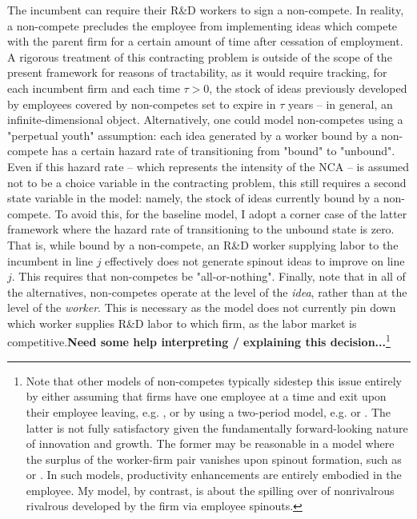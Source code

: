 \documentclass[12pt,english]{article}
\theoremstyle{remark}
\begin{document}
The incumbent can require their R\&D workers to sign a non-compete. In reality, a non-compete precludes the employee from implementing ideas which compete with the parent firm for a certain amount of time after cessation of employment. A rigorous treatment of this contracting problem is outside of the scope of the present framework for reasons of tractability, as it would require tracking, for each incumbent firm and each time $\tau > 0$, the stock of ideas previously developed by employees covered by non-competes set to expire in $\tau$ years -- in general, an infinite-dimensional object. Alternatively, one could model non-competes using a "perpetual youth" assumption: each idea generated by a worker bound by a non-compete has a certain hazard rate of transitioning from "bound" to "unbound". Even if this hazard rate -- which represents the intensity of the NCA -- is assumed not to be a choice variable in the contracting problem, this still requires a second state variable in the model: namely, the stock of ideas currently bound by a non-compete. To avoid this, for the baseline model, I adopt a corner case of the latter framework where the hazard rate of transitioning to the unbound state is zero. That is, while bound by a non-compete, an R\&D worker supplying labor to the incumbent in line $j$ effectively does not generate spinout ideas to improve on line $j$. This requires that non-competes be "all-or-nothing". Finally, note that in all of the alternatives, non-competes operate at the level of the \textit{idea}, rather than at the level of the \textit{worker}. This is necessary as the model does not currently pin down which worker supplies R\&D labor to which firm, as the labor market is competitive.\textbf{Need some help interpreting / explaining this decision...}\footnote{Note that other models of non-competes typically sidestep this issue entirely by either assuming that firms have one employee at a time and exit upon their employee leaving, e.g. \cite{shi_restrictions_2018}, or by using a two-period model, e.g. \cite{franco_spin-outs:_2006} or \cite{franco_covenants_2008}. The latter is not fully satisfactory given the fundamentally forward-looking nature of innovation and growth. The former may be reasonable in a model where the surplus of the worker-firm pair vanishes upon spinout formation, such as \cite{shi_restrictions_2018} or \cite{baslandze_spinout_2019}. In such models, productivity enhancements are entirely embodied in the employee. My model, by contrast, is about the spilling over of nonrivalrous rivalrous developed by the firm via employee spinouts.}
\end{document}
